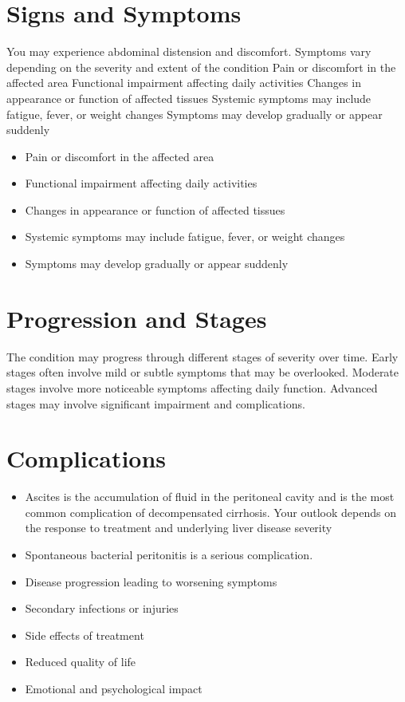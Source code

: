 \section{Signs and Symptoms}
You may experience abdominal distension and discomfort. Symptoms vary depending on the severity and extent of the condition Pain or discomfort in the affected area Functional impairment affecting daily activities Changes in appearance or function of affected tissues Systemic symptoms may include fatigue, fever, or weight changes Symptoms may develop gradually or appear suddenly

\begin{itemize}[noitemsep]
  \item Pain or discomfort in the affected area
  \item Functional impairment affecting daily activities
  \item Changes in appearance or function of affected tissues
  \item Systemic symptoms may include fatigue, fever, or weight changes
  \item Symptoms may develop gradually or appear suddenly
\end{itemize}
\section{Progression and Stages}
The condition may progress through different stages of severity over time. Early stages often involve mild or subtle symptoms that may be overlooked. Moderate stages involve more noticeable symptoms affecting daily function. Advanced stages may involve significant impairment and complications.
\section{Complications}
\begin{itemize}[noitemsep]
  \item Ascites is the accumulation of fluid in the peritoneal cavity and is the most common complication of decompensated cirrhosis. Your outlook depends on the response to treatment and underlying liver disease severity
  \item Spontaneous bacterial peritonitis is a serious complication.
  \item Disease progression leading to worsening symptoms
  \item Secondary infections or injuries
  \item Side effects of treatment
  \item Reduced quality of life
  \item Emotional and psychological impact
\end{itemize}
